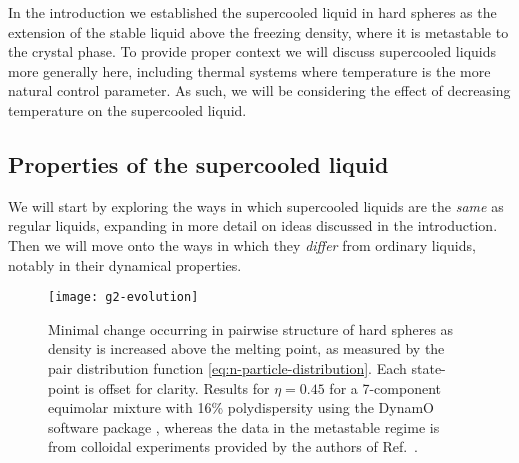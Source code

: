 
In the introduction we established the supercooled liquid in hard spheres as the extension of the stable liquid above the freezing density, where it is metastable to the crystal phase.
To provide proper context we will discuss supercooled liquids more generally here, including thermal systems where temperature is the more natural control parameter.
As such, we will be considering the effect of decreasing temperature on the supercooled liquid.


\subsection{Properties of the supercooled liquid}

We will start by exploring the ways in which supercooled liquids are the \emph{same} as regular liquids, expanding in more detail on ideas discussed in the introduction.
Then we will move onto the ways in which they \emph{differ} from ordinary liquids, notably in their dynamical properties.

\begin{SCfigure}
  \texttt{[image: g2-evolution]}
  \caption[Structural change in the supercooled liquid (at the pair level)]{
    Minimal change occurring in pairwise structure of hard spheres as density is increased above the melting point, as measured by the pair distribution function \eqref{eq:n-particle-distribution}.
    Each state-point is offset for clarity.
    Results for $\eta = 0.45$ for a 7-component equimolar mixture with 16\% polydispersity using the DynamO software package \cite{BannermanJCC2011}, whereas the data in the metastable regime is from colloidal experiments provided by the authors of Ref.\ \cite{HallettNC2018}.
  }
  \label{fig:g2-changes}
\end{SCfigure}

